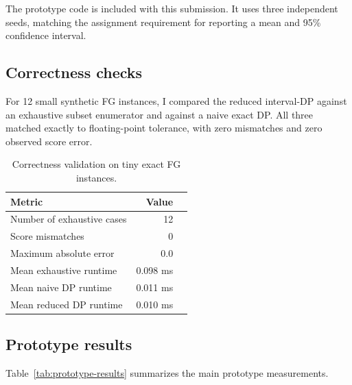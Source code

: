 \documentclass[11pt]{article}
\begin{document}
The prototype code is included with this submission. It uses three independent seeds, matching the assignment requirement for reporting a mean and 95\% confidence interval.

\subsection{Correctness checks}

For 12 small synthetic FG instances, I compared the reduced interval-DP against an exhaustive subset enumerator and against a naive exact DP. All three matched exactly to floating-point tolerance, with zero mismatches and zero observed score error.

\begin{table}[H]
\centering
\caption{Correctness validation on tiny exact FG instances.}
\label{tab:correctness}
\small
\begin{tabular}{lrr}
\toprule
\textbf{Metric} & \textbf{Value} \\
\midrule
Number of exhaustive cases & 12 \\
Score mismatches & 0 \\
Maximum absolute error & 0.0 \\
Mean exhaustive runtime & 0.098 ms \\
Mean naive DP runtime & 0.011 ms \\
Mean reduced DP runtime & 0.010 ms \\
\bottomrule
\end{tabular}
\end{table}

\subsection{Prototype results}

Table~\ref{tab:prototype-results} summarizes the main prototype measurements.
\end{document}
